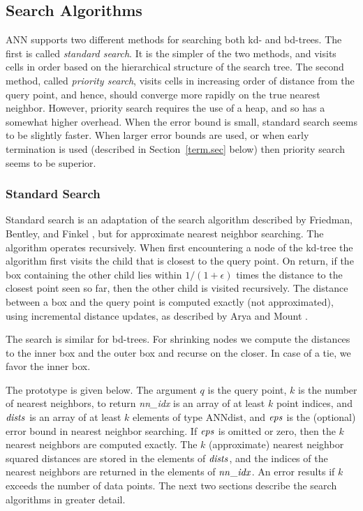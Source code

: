 \documentclass[11pt]{article}		%
\newcommand{\ANN}[0]{\textsf{ANN}}
\begin{document}
\subsection{Search Algorithms}\label{search.sec}

{\ANN} supports two different methods for searching both kd- and bd-trees.
The first is called \emph{standard search}.  It is the simpler of
the two methods, and visits cells in order based on the hierarchical
structure of the search tree.  The second method, called \emph{priority search},
visits cells in increasing order of distance from the query point, and
hence, should converge more rapidly on the true nearest neighbor.  However,
priority search requires the use of a heap, and so has a somewhat higher
overhead.  When the error bound is small, standard search seems to be
slightly faster.  When larger error bounds are used, or when early
termination is used (described in Section~\ref{term.sec} below) then
priority search seems to be superior.

\subsubsection{Standard Search}\label{stdsearch.sec}

Standard search is an adaptation of the search algorithm described by
Friedman, Bentley, and Finkel \cite{FBF77}, but for approximate nearest
neighbor searching.  The algorithm operates recursively.  When first
encountering a node of the kd-tree the algorithm first visits the child
that is closest to the query point.  On return, if the box containing
the other child lies within $1/(1+\epsilon)$ times the distance to the
closest point seen so far, then the other child is visited recursively.
The distance between a box and the query point is computed exactly (not
approximated), using incremental distance updates, as described by Arya
and Mount \cite{ArM93b}.

The search is similar for bd-trees.  For shrinking nodes we compute the
distances to the inner box and the outer box and recurse on the closer.
In case of a tie, we favor the inner box.

The prototype is given below.  The argument $q$ is the query point, $k$
is the number of nearest neighbors, to return \textit{nn\_idx} is an
array of at least $k$ point indices, and $\it dists$ is an array of at
least $k$ elements of type \textsf{ANNdist}, and $\it eps$ is the
(optional) error bound in nearest neighbor searching.  If $\it eps$ is
omitted or zero, then the $k$ nearest neighbors are computed exactly.
The $k$ (approximate) nearest neighbor squared distances are stored in
the elements of $\it dists$, and the indices of the nearest neighbors
are returned in the elements of $\it nn\_idx$.  An error results if $k$
exceeds the number of data points.  The next two sections describe the
search algorithms in greater detail.
\end{document}
